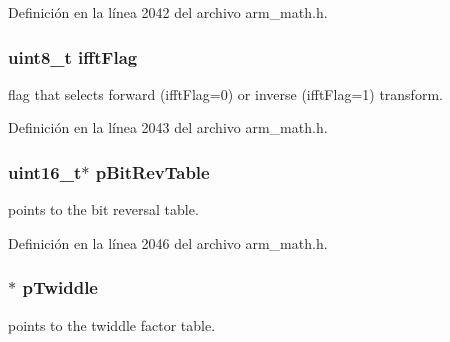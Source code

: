 Definición en la línea 2042 del archivo arm\+\_\+math.\+h.

\subsubsection[{\texorpdfstring{ifft\+Flag}{ifftFlag}}]{\setlength{\rightskip}{0pt plus 5cm}uint8\+\_\+t ifft\+Flag}\hypertarget{structarm__cfft__radix4__instance__q31_ad6ca6e223f986ebfd94c5ee1e410aa73}{}\label{structarm__cfft__radix4__instance__q31_ad6ca6e223f986ebfd94c5ee1e410aa73}
flag that selects forward (ifft\+Flag=0) or inverse (ifft\+Flag=1) transform. 

Definición en la línea 2043 del archivo arm\+\_\+math.\+h.

\subsubsection[{\texorpdfstring{p\+Bit\+Rev\+Table}{pBitRevTable}}]{\setlength{\rightskip}{0pt plus 5cm}uint16\+\_\+t$\ast$ p\+Bit\+Rev\+Table}\hypertarget{structarm__cfft__radix4__instance__q31_a46a2fb328199897af100fea0bfdf59aa}{}\label{structarm__cfft__radix4__instance__q31_a46a2fb328199897af100fea0bfdf59aa}
points to the bit reversal table. 

Definición en la línea 2046 del archivo arm\+\_\+math.\+h.

\subsubsection[{\texorpdfstring{p\+Twiddle}{pTwiddle}}]{$\ast$ p\+Twiddle}\hypertarget{structarm__cfft__radix4__instance__q31_a2505b7d5ec077b244c712797a5253b6d}{}\label{structarm__cfft__radix4__instance__q31_a2505b7d5ec077b244c712797a5253b6d}
points to the twiddle factor table. 

